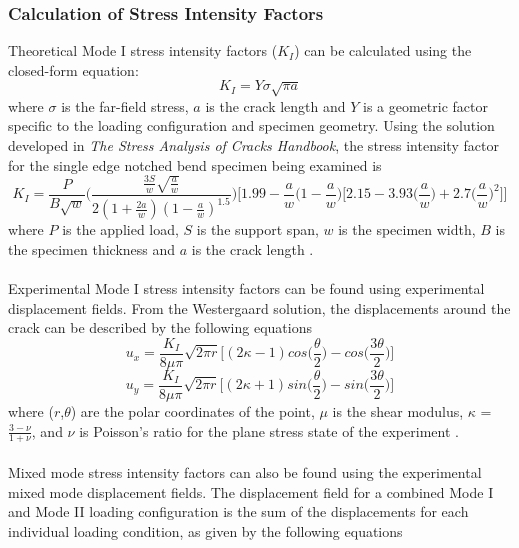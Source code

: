 \documentclass[12pt]{article}
\begin{document}
\subsubsection{Calculation of Stress Intensity Factors} %
Theoretical Mode I stress intensity factors ($K_{I}$) can be calculated using the closed-form equation:
\begin{equation}
K_{I} = Y\sigma\sqrt{\pi a}
\end{equation}
where $\sigma$ is the far-field stress, $a$ is the crack length and $Y$ is a geometric factor specific to the loading configuration and specimen geometry. Using the solution developed in \textit{The Stress Analysis of Cracks Handbook}, the stress intensity factor for the single edge notched bend specimen being examined is 
\begin{equation}
K_{I} = \frac{P}{B\sqrt{w}}\Bigg(\frac{\frac{3S}{w}\sqrt{\frac{a}{w}}}{2(1+\frac{2a}{w})(1-\frac{a}{w})^{1.5}}\Bigg)\Bigg[1.99-\frac{a}{w}\Big(1-\frac{a}{w}\Big)\Big[2.15-3.93\Big(\frac{a}{w}\Big)+2.7\Big(\frac{a}{w}\Big)^2\Big]\Bigg]
\end{equation}
where $P$ is the applied load, $S$ is the support span, $w$ is the specimen width, $B$ is the specimen thickness and $a$ is the crack length \cite{notch}. 
\\ \\
Experimental Mode I stress intensity factors can be found using experimental displacement fields. From the Westergaard solution, the displacements around the crack can be described by the following equations 
\begin{equation}
u_{x} = \frac{K_{I}}{8\mu \pi}\sqrt{2\pi r}\bigg[(2\kappa-1)cos\bigg(\frac{\theta}{2}\bigg)-cos\bigg(\frac{3\theta}{2}\bigg)\bigg]
\end{equation}
\begin{equation}
u_{y} = \frac{K_{I}}{8\mu \pi}\sqrt{2\pi r}\bigg[(2\kappa+1)sin\bigg(\frac{\theta}{2}\bigg)-sin\bigg(\frac{3\theta}{2}\bigg)\bigg]
\end{equation}
where ($r$,$\theta$) are the polar coordinates of the point, $\mu$ is the shear modulus, $\kappa$ = $\frac{3-\nu}{1+\nu}$, and $\nu$ is Poisson's ratio for the plane stress state of the experiment \cite{Fracture}.
\\ \\
Mixed mode stress intensity factors can also be found using the experimental mixed mode displacement fields. The displacement field for a combined Mode I and Mode II loading configuration is the sum of the displacements for each individual loading condition, as given by the following equations 
\end{document}
